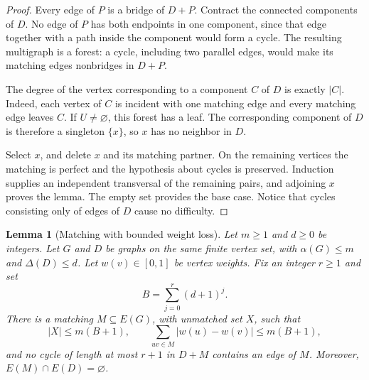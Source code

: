 \documentclass[11pt]{article}
\newtheorem{lemma}[theorem]{Lemma}
\begin{document}
\begin{proof} Every edge of \(P\) is a bridge of \(D+P\). Contract the connected
 components of \(D\). No edge of \(P\) has both endpoints in one component, since that
 edge together with a path inside the component would form a cycle. The resulting
 multigraph is a forest: a cycle, including two parallel edges, would make its matching
 edges nonbridges in \(D+P\).

The degree of the vertex corresponding to a component \(C\) of \(D\) is exactly \(|C|\).
 Indeed, each vertex of \(C\) is incident with one matching edge and every matching edge
 leaves \(C\). If \(U\ne\varnothing\), this forest has a leaf. The corresponding
 component of \(D\) is therefore a singleton \(\{x\}\), so \(x\) has no neighbor in
 \(D\).

Select \(x\), and delete \(x\) and its matching partner. On the remaining vertices the
 matching is perfect and the hypothesis about cycles is preserved. Induction supplies an
 independent transversal of the remaining pairs, and adjoining \(x\) proves the lemma.
 The empty set provides the base case. Notice that cycles consisting only of edges of
 \(D\) cause no difficulty. \end{proof}

\begin{lemma}[Matching with bounded weight loss]\label{lem:weighted} Let \(m\ge1\) and
 \(d\ge0\) be integers. Let \(G\) and \(D\) be graphs on the same finite vertex set,
 with \(\alpha(G)\le m\) and \(\Delta(D)\le d\). Let \(w(v)\in[0,1]\) be vertex weights.
 Fix an integer \(r\ge1\) and set \[
B=\sum_{j=0}^{r}(d+1)^j.
\] There is a matching \(M\subseteq E(G)\), with unmatched set \(X\), such that
 \begin{equation}\label{eq:matchingloss}
|X|\le m(B+1),\qquad
\sum_{uv\in M}|w(u)-w(v)|\le m(B+1),
\end{equation} and no cycle of length at most \(r+1\) in \(D+M\) contains an edge of
 \(M\). Moreover, \(E(M)\cap E(D)=\varnothing\).

\end{lemma}
\end{document}
